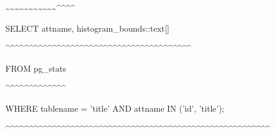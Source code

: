\documentclass[11pt,a4paper]{article}
\begin{document}
{\textasciitilde{}\textasciitilde{}\textasciitilde{}\textasciitilde{}\textasciitilde{}\textasciitilde{}\textasciitilde{}\textasciitilde{}\textasciitilde{}\textasciitilde{}\textasciitilde{}\textasciicircum{}\textasciicircum{}\textasciicircum{}\textasciicircum{}

SELECT attname, histogram\_bounds::text[]

\textasciicircum{}\textasciicircum{}\textasciicircum{}\textasciicircum{}\textasciicircum{}\textasciicircum{}\textasciicircum{}\textasciicircum{}\textasciicircum{}\textasciicircum{}\textasciicircum{}\textasciicircum{}\textasciicircum{}\textasciicircum{}\textasciicircum{}\textasciicircum{}\textasciicircum{}\textasciicircum{}\textasciicircum{}\textasciicircum{}\textasciicircum{}\textasciicircum{}\textasciicircum{}\textasciicircum{}\textasciicircum{}\textasciicircum{}\textasciicircum{}\textasciicircum{}\textasciicircum{}\textasciicircum{}\textasciicircum{}\textasciicircum{}\textasciicircum{}\textasciicircum{}\textasciicircum{}\textasciicircum{}\textasciicircum{}\textasciicircum{}\textasciicircum{}\textasciicircum{}

FROM pg\_stats

\textasciicircum{}\textasciicircum{}\textasciicircum{}\textasciicircum{}\textasciicircum{}\textasciicircum{}\textasciicircum{}\textasciicircum{}\textasciicircum{}\textasciicircum{}\textasciicircum{}\textasciicircum{}\textasciicircum{}

WHERE tablename = 'title' AND attname IN ('id', 'title');

\textasciicircum{}\textasciicircum{}\textasciicircum{}\textasciicircum{}\textasciicircum{}\textasciicircum{}\textasciicircum{}\textasciicircum{}\textasciicircum{}\textasciicircum{}\textasciicircum{}\textasciicircum{}\textasciicircum{}\textasciicircum{}\textasciicircum{}\textasciicircum{}\textasciicircum{}\textasciicircum{}\textasciicircum{}\textasciicircum{}\textasciicircum{}\textasciicircum{}\textasciicircum{}\textasciicircum{}\textasciicircum{}\textasciicircum{}\textasciicircum{}\textasciicircum{}\textasciicircum{}\textasciicircum{}\textasciicircum{}\textasciicircum{}\textasciicircum{}\textasciicircum{}\textasciicircum{}\textasciicircum{}\textasciicircum{}\textasciicircum{}\textasciicircum{}\textasciicircum{}\textasciicircum{}\textasciicircum{}\textasciicircum{}\textasciicircum{}\textasciicircum{}\textasciicircum{}\textasciicircum{}\textasciicircum{}\textasciicircum{}\textasciicircum{}\textasciicircum{}\textasciicircum{}\textasciicircum{}\textasciicircum{}\textasciicircum{}\textasciicircum{}\textasciicircum{}

}
\end{document}
